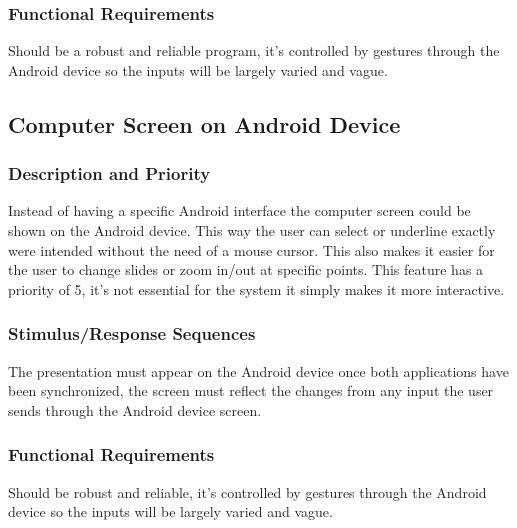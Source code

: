 \documentclass{article}
\begin{document}
\subsubsection{Functional Requirements}
Should be a robust and reliable program, it's controlled by gestures through the Android device so the inputs will be largely varied and vague.

\subsection{Computer Screen on Android Device}
\subsubsection{Description and Priority}
Instead of having a specific Android interface the computer screen could be shown on the Android device. 
This way the user can select or underline exactly were intended without the need of a mouse cursor. 
This also makes it easier for the user to change slides or zoom in/out at specific points. 
This feature has a priority of 5, it's not essential for the system it simply makes it more interactive. 
\subsubsection{Stimulus/Response Sequences}
The presentation must appear on the Android device once both applications have been synchronized, the screen must reflect the changes from any input the user sends through the Android device screen.
\subsubsection{Functional Requirements}
Should be robust and reliable, it's controlled by gestures through the Android device so the inputs will be largely varied and vague.


\end{document}
